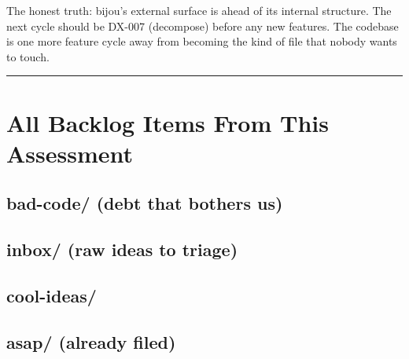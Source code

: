 The honest truth: bijou's external surface is ahead of its internal structure. The next cycle should be DX-007 (decompose) before any new features. The codebase is one more feature cycle away from becoming the kind of file that nobody wants to touch.

\begin{center}\rule{0.5\linewidth}{0.5pt}\end{center}

\section{All Backlog Items From This Assessment}\label{record-411-all-backlog-items-from-this-assessment}

\subsection{bad-code/ (debt that bothers us)}\label{record-411-bad-code-debt-that-bothers-us}



\subsection{inbox/ (raw ideas to triage)}\label{record-411-inbox-raw-ideas-to-triage}



\subsection{cool-ideas/}\label{record-411-cool-ideas}



\subsection{asap/ (already filed)}\label{record-411-asap-already-filed}



